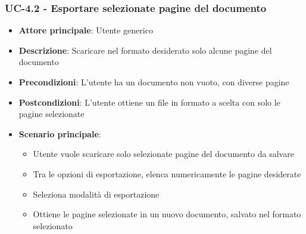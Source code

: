 \documentclass[11pt,a4paper]{article}
\begin{document}
\subsubsection{UC-4.2 - Esportare selezionate pagine del documento}
\begin{itemize}
    \item \textbf{Attore principale}: Utente generico
    \item \textbf{Descrizione}: Scaricare nel formato desiderato solo alcune pagine del documento
    \item \textbf{Precondizioni}: L'utente ha un documento non vuoto, con diverse pagine
    \item \textbf{Postcondizioni}: L'utente ottiene un file in formato a scelta con solo le pagine selezionate
    \item \textbf{Scenario principale}:
        \begin{itemize}
            \item Utente vuole scaricare solo selezionate pagine del documento da salvare
            \item Tra le opzioni di esportazione, elenca numericamente le pagine desiderate
            \item Seleziona modalità di esportazione
            \item Ottiene le pagine selezionate in un nuovo documento, salvato nel formato selezionato
        \end{itemize}
\end{itemize}
\end{document}
